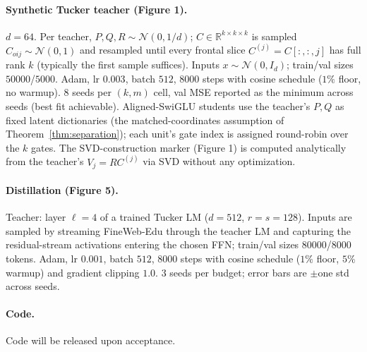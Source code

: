 \paragraph{Synthetic Tucker teacher (Figure 1).}
$d{=}64$. Per teacher, $P, Q, R \sim \mathcal{N}(0, 1/d)$;
$C \in \mathbb{R}^{k \times k \times k}$ is sampled
$C_{oij} \sim \mathcal{N}(0, 1)$ and resampled until every frontal slice
$C^{(j)} = C[:, :, j]$ has full rank $k$ (typically the first sample
suffices). Inputs $x \sim \mathcal{N}(0, I_d)$;
train/val sizes $50000$/$5000$.
Adam, lr $0.003$, batch $512$,
$8000$ steps with cosine schedule
($1\%$ floor, no warmup). $8$ seeds per
$(k, m)$ cell, val MSE reported as the minimum across seeds (best fit
achievable). Aligned-SwiGLU students use the teacher's $P, Q$ as fixed
latent dictionaries (the matched-coordinates assumption of
Theorem~\ref{thm:separation}); each unit's gate index is assigned
round-robin over the $k$ gates. The SVD-construction marker (Figure 1)
is computed analytically from the teacher's $V_j = R C^{(j)}$ via SVD
without any optimization.

\paragraph{Distillation (Figure 5).}
Teacher: layer $\ell{=}4$ of a trained Tucker
LM ($d{=}512$, $r{=}s{=}128$). Inputs are sampled by streaming
FineWeb-Edu through the teacher LM and capturing the residual-stream
activations entering the chosen FFN; train/val sizes
$80000$/$8000$ tokens.
Adam, lr $0.001$, batch $512$,
$8000$ steps with cosine schedule
($1\%$ floor, $5\%$ warmup) and gradient clipping $1.0$.
$3$ seeds per budget; error bars are
$\pm$one std across seeds.

\paragraph{Code.} Code will be released upon acceptance.
